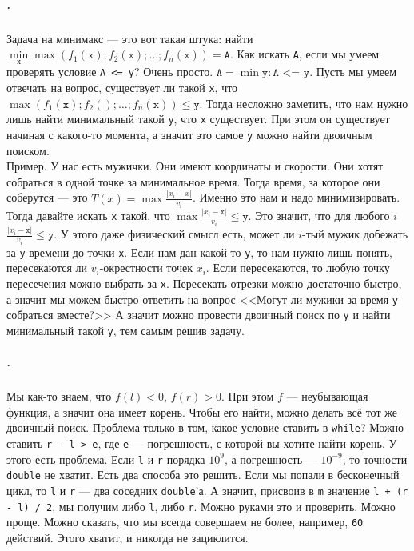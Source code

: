 \documentclass{article}
\newcommand{\pseudo}{PseudoLexer.py:PseudoLexer -x}
\newcommand{\pseudocode}[1]{\texttt{#1}}
\begin{document}
    \subparagraph{.}
    Задача на минимакс --- это вот такая штука: найти\\
    $\min\limits_{\pseudocode{x}}\max(f_1(\pseudocode{x});f_2(\pseudocode{x});\ldots;f_n(\pseudocode{x}))=\pseudocode{A}$. Как искать \pseudocode{A}, если мы умеем проверять условие \pseudocode{A <= y}? Очень просто. $\pseudocode{A}=\min\pseudocode{y}\colon\pseudocode{A <= y}$. Пусть мы умеем отвечать на вопрос, существует ли такой \pseudocode{x}, что $\max(f_1(\pseudocode{x});f_2(\pseudocode{});\ldots;f_n(\pseudocode{x}))\leqslant\pseudocode{y}$. Тогда несложно заметить, что нам нужно лишь найти минимальный такой \pseudocode{y}, что \pseudocode{x} существует. При этом он существует начиная с какого-то момента, а значит это самое \pseudocode{y} можно найти двоичным поиском.\\
    Пример. У нас есть мужички. Они имеют координаты и скорости. Они хотят собраться в одной точке за минимальное время. Тогда время, за которое они соберутся --- это $T(x)=\max\frac{|x_i-x|}{v_i}$. Именно это нам и надо минимизировать. Тогда давайте искать \pseudocode{x} такой, что $\max\frac{|x_i-\pseudocode{x}|}{v_i}\leqslant\pseudocode{y}$. Это значит, что для любого $i$ $\frac{|x_i-\pseudocode{x}|}{v_i}\leqslant\pseudocode{y}$. У этого даже физический смысл есть, может ли $i$-тый мужик добежать за \pseudocode{y} времени до точки \pseudocode{x}. Если нам дан какой-то \pseudocode{y}, то нам нужно лишь понять, пересекаются ли $v_i$-окрестности точек $x_i$. Если пересекаются, то любую точку пересечения можно выбрать за \pseudocode{x}. Пересекать отрезки можно достаточно быстро, а значит мы можем быстро ответить на вопрос <<Могут ли мужики за время \pseudocode{y} собраться вместе?>> А значит можно провести двоичный поиск по \pseudocode{y} и найти минимальный такой \pseudocode{y}, тем самым решив задачу.
    \subparagraph{.}
    Мы как-то знаем, что $f(l)<0$, $f(r)>0$. При этом $f$ --- неубывающая функция, а значит она имеет корень. Чтобы его найти, можно делать всё тот же двоичный поиск. Проблема только в том, какое условие ставить в \pseudocode{while}? Можно ставить \pseudocode{r - l > e}, где \pseudocode{e} --- погрешность, с которой вы хотите найти корень. У этого есть проблема. Если \pseudocode{l} и \pseudocode{r} порядка $10^9$, а погрешность --- $10^{-9}$, то точности \texttt{double} не хватит. Есть два способа это решить. Если мы попали в бесконечный цикл, то \pseudocode{l} и \pseudocode{r} --- два соседних \texttt{double}'а. А значит, присвоив в \pseudocode{m} значение \pseudocode{l + (r - l) / 2}, мы получим либо \pseudocode{l}, либо \pseudocode{r}. Можно руками это и проверить. Можно проще. Можно сказать, что мы всегда совершаем не более, например, \pseudocode{60} действий. Этого хватит, и никогда не зациклится.
\end{document}
